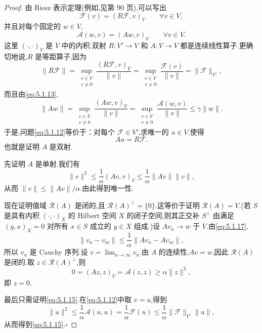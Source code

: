 \begin{proof}
由 Riesz 表示定理(例如,见第 90 页),可以写出
\[
  \mathcal F(v)=(R\mathcal F,v)_V\qquad\forall v\in V,
\]
并且对每个固定的 \(w\in V\),
\[
  \mathcal A(w,v)=(Aw,v)_V\qquad\forall v\in V.
\]
这里 \((\cdot,\cdot)_V\) 是 \(V\) 中的内积.双射 \(R\colon V'\to V\) 和 \(A\colon V\to V\) 都是连续线性算子.更确切地说,\(R\) 是等距算子,因为
\[
  \|R\mathcal F\|=\sup_{\substack{v\in V\\v\ne0}}\frac{(R\mathcal F,v)_V}{\|v\|}
     =\sup_{\substack{v\in V\\v\ne0}}\frac{\mathcal F(v)}{\|v\|}
     =\|\mathcal F\|_{V'},
\]
而且由\eqref{eq:5.1.13},
\[
  \|Aw\|=\sup_{\substack{v\in V\\v\ne0}}\frac{(Aw,v)_V}{\|v\|}
     =\sup_{\substack{v\in V\\v\ne0}}\frac{\mathcal A(w,v)}{\|v\|}
     \le\gamma\|w\|.
\]
于是,问题\eqref{eq:5.1.12}等价于：对每个 \(\mathcal F\in V'\),求唯一的 \(u\in V\),使得
\begin{equation}\label{eq:5.1.16}
  Au=R\mathcal F.
\end{equation}
也就是证明 \(A\) 是双射.

先证明 \(A\) 是单射.我们有
\begin{equation}\label{eq:5.1.17}
  \|v\|^2\le\frac1\alpha(Av,v)_V
    \le\frac1\alpha\|Av\|\|v\|,
\end{equation}
从而 \(\|v\|\le\|Av\|/\alpha\).由此得到唯一性.

现在证明值域 \(\mathcal R(A)\) 是闭的,且 \(\mathcal R(A)^\perp=\{0\}\).这等价于证明 \(\mathcal R(A)=V\).(若 \(S\) 是具有内积 \((\cdot,\cdot)_X\) 的 Hilbert 空间 \(X\) 的闭子空间,则其正交补 \(S^\perp\) 由满足 \((y,x)_X=0\) 对所有 \(x\in S\) 成立的 \(y\in X\) 组成.)设 \(Av_n\to w\) 于 \(V\).由\eqref{eq:5.1.17},
\[
  \|v_n-v_m\|\le\frac1\alpha\|Av_n-Av_m\|,
\]
所以 \(v_n\) 是 Cauchy 序列.设 \(v=\lim_{n\to\infty}v_n\).由 \(A\) 的连续性,\(Av=w\),因此 \(\mathcal R(A)\) 是闭的.取 \(z\in\mathcal R(A)^\perp\),则
\[
  0=(Az,z)_V=\mathcal A(z,z)\ge\alpha\|z\|^2,
\]
即 \(z=0\).

最后只需证明\eqref{eq:5.1.15}.在\eqref{eq:5.1.12}中取 \(v=u\),得到
\[
  \|u\|^2\le\frac1\alpha\mathcal A(u,u)=\frac1\alpha\mathcal F(u)
    \le\frac1\alpha\|\mathcal F\|_{V'}\|u\|,
\]
从而得到\eqref{eq:5.1.15}.\hfill\(\square\)
\end{proof}

